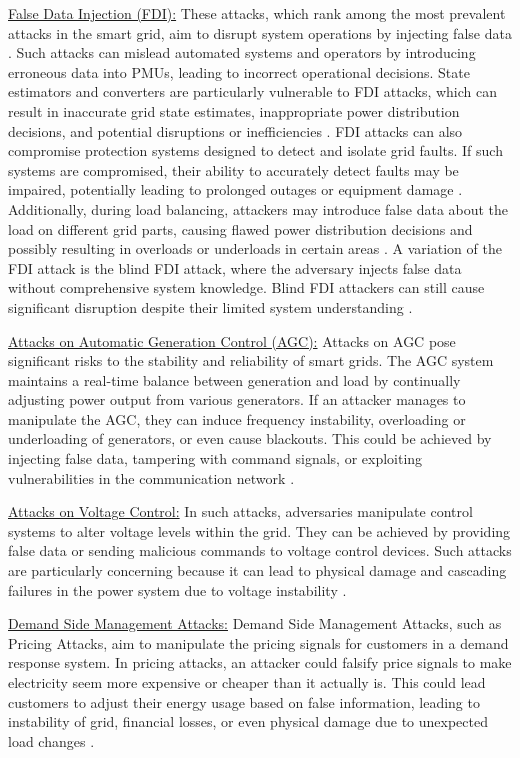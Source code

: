 \documentclass[10pt, journal]{IEEEtran}
\begin{document}
\underline{False Data Injection (FDI):} These attacks, which rank among the most prevalent attacks in the smart grid, aim to disrupt system operations by injecting false data \cite{liang2016review}. Such attacks can mislead automated systems and operators by introducing erroneous data into PMUs, leading to incorrect operational decisions. State estimators and converters are particularly vulnerable to FDI attacks, which can result in inaccurate grid state estimates, inappropriate power distribution decisions, and potential disruptions or inefficiencies \cite{liu2011false, bobba2010detecting, xie2010false, besati2023new}. FDI attacks can also compromise protection systems designed to detect and isolate grid faults. If such systems are compromised, their ability to accurately detect faults may be impaired, potentially leading to prolonged outages or equipment damage \cite{teixeira2010cyber}. Additionally, during load balancing, attackers may introduce false data about the load on different grid parts, causing flawed power distribution decisions and possibly resulting in overloads or underloads in certain areas \cite{zhang2018distributed}. A variation of the FDI attack is the blind FDI attack, where the adversary injects false data without comprehensive system knowledge. Blind FDI attackers can still cause significant disruption despite their limited system understanding \cite{yu2015blind}. 
			
\underline{Attacks on Automatic Generation Control (AGC):} Attacks on AGC pose significant risks to the stability and reliability of smart grids. The AGC system maintains a real-time balance between generation and load by continually adjusting power output from various generators. If an attacker manages to manipulate the AGC, they can induce frequency instability, overloading or underloading of generators, or even cause blackouts. This could be achieved by injecting false data, tampering with command signals, or exploiting vulnerabilities in the communication network \cite{sridhar2014model, ameli2018attack}.
			
\underline{Attacks on Voltage Control:} In such attacks, adversaries manipulate control systems to alter voltage levels within the grid. They can be achieved by providing false data or sending malicious commands to voltage control devices. Such attacks are particularly concerning because it can lead to physical damage and cascading failures in the power system due to voltage instability \cite{isozaki2015detection}.
			
\underline{Demand Side Management Attacks:} Demand Side Management Attacks, such as Pricing Attacks, aim to manipulate the pricing signals for customers in a demand response system. In pricing attacks, an attacker could falsify price signals to make electricity seem more expensive or cheaper than it actually is. This could lead customers to adjust their energy usage based on false information, leading to instability of grid, financial losses, or even physical damage due to unexpected load changes \cite{giraldo2016integrity,tan2013impact}.
			
\end{document}
